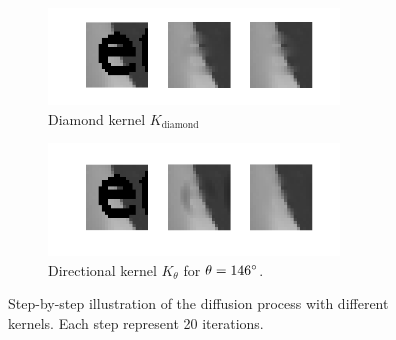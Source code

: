 \begin{figure}
	\centering
	\begin{subfigure}[b]{0.4\textwidth}
		\centering
		\includegraphics[clip, trim=0cm 1cm 0cm 0.5cm, width=0.85\textwidth]{figures/step-by-step-cross}
		\caption{Diamond kernel $K_{\text{diamond}}$}
		\label{fig:stepbystepcross}
	\end{subfigure}
	\begin{subfigure}[b]{0.4\textwidth}
		\centering
		\includegraphics[clip, trim=0cm 1cm 0cm 0.5cm, width=0.85\textwidth]{figures/step-by-step-directional}
		\caption{Directional kernel $K_\theta$ for $\theta = 146\degree$.}
		\label{fig:stepbystepdir}
	\end{subfigure}
	\caption{Step-by-step illustration of the diffusion process with different kernels. Each step represent 20 iterations.}
\end{figure}